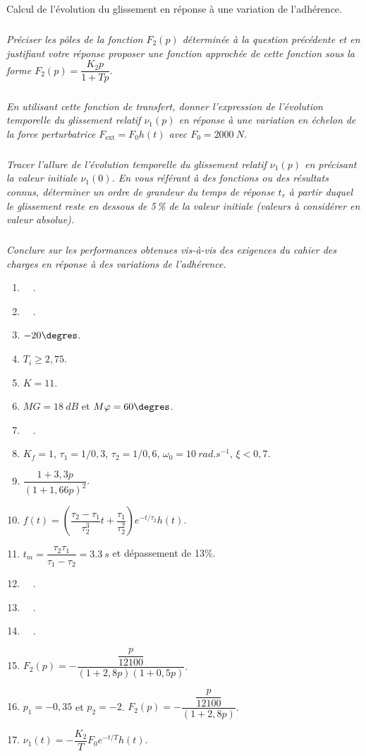 \documentclass[10pt,fleqn]{article} %
\begin{document}
\begin{multicols}{2}
\begin{obj}
Calcul de l’évolution du glissement en réponse à une variation de l’adhérence.
\end{obj}

\subparagraph{}\textit{Préciser les pôles de la fonction $F_2(p)$ déterminée à la question précédente et en
justifiant votre réponse proposer une fonction approchée de cette fonction sous
la forme $F_2(p)=\dfrac{K_2 p}{1+Tp}$.}

\subparagraph{}\textit{En utilisant cette fonction de transfert, donner l’expression de l’évolution
temporelle du glissement relatif $\nu_1(p)$ en réponse à une variation en échelon de
la force perturbatrice $F_{\text{ext}}=F_0 h(t)$ avec $F_0=\SI{2000}{N}$.}

\subparagraph{}\textit{Tracer l’allure de l’évolution temporelle du glissement relatif $\nu_1(p)$ en précisant
la valeur initiale $\nu_1(0)$. En vous référant à des fonctions ou des résultats
connus, déterminer un ordre de grandeur du temps de réponse $t_r$ à partir
duquel le glissement reste en dessous de 5\,\% de la valeur initiale (valeurs
à considérer en valeur absolue).}

\subparagraph{}\textit{Conclure sur les performances obtenues vis-à-vis des exigences du cahier des
charges en réponse à des variations de l’adhérence.}


\end{multicols}
%
\begin{multicols}{2}
\begin{enumerate}
\item $\quad$.
\item $\quad$.
\item $-20\degres$.
\item $T_i\geq 2,75$.
\item $K=11$.
\item $MG = \SI{18}{dB}$ et $M \varphi  = 60\degres$.
\item $\quad$.
\item $K_f=1$, $\tau_1=1/0,3$, $\tau_2=1/0,6$, $\omega_0=\SI{10}{rad.s^{-1}}$, $\xi<0,7$.
\item $\dfrac{1+3,3 p}{\left(1+1,66 p\right)^2}$.
\item $f(t)=\left( \dfrac{\tau_2-\tau_1}{\tau_2^3}t+\dfrac{\tau_1}{\tau_2^2}\right) e^{-t/\tau_2}h(t)$.
\item $t_m=\dfrac{\tau_2\tau_1}{\tau_1-\tau_2}=\SI{3,3}{s}$ et dépassement de 13\%.
\item $\quad$.
\item $\quad$.
\item $\quad$.
\item $F_2(p)=-\dfrac{\dfrac{p}{12100}}{\left(1+2,8p\right)\left(1+0,5p\right)}$.
\item $p_1=-0,35$ et $p_2=-2$. $F_2(p)=-\dfrac{\dfrac{p}{12100}}{\left(1+2,8p\right)}$.
\item $\nu_1(t)=-\dfrac{K_2}{T}F_0 e^{-t/T}h(t)$.

\end{enumerate}
 
\end{multicols}

 
 
%
\end{document}
